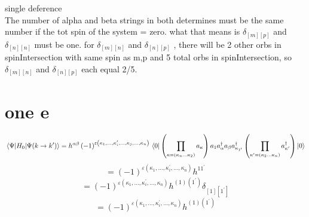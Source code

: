 \documentclass{article}
\begin{document}
single deference\\
The number of alpha and beta strings in both determines must be the same number if the tot spin of the system = zero.  what that means is $\delta _{[m][p]}$ and $\delta _{[n][n]}$ must be one. for $\delta _{[m][n]}$ and $\delta _{[n][p]}$ , there will be 2 other orbs in spinIntersection with same spin as m,p and 5 total orbs in spinIntersection, so $\delta _{[m][n]}$ and $\delta _{[n][p]}$ each equal 2/5.
\section{one e}
\begin{equation}
    \mel{\Psi }{H_{0}}{\Psi (k\rightarrow k^{\prime})}=h^{\alpha\beta}\left(-1\right)^{\varepsilon\left(\kappa_{1},\dots,\kappa_{i}^{\prime},\dots,\kappa _{j},...,\kappa_{n}\right)}\\
    \bra{0}\left(\prod_{\kappa=\left(\kappa_{n}\dots\kappa_{2}\right)}a_{\kappa}\right)
        a_{1}a^{\dag}_{\alpha  }a_{\beta }a^{\dag}_{\kappa _{1^{\prime}}}
    \left(\prod_{\kappa^{\prime}=\left(\kappa_{2}\dots\kappa_{n}\right)}a^{\dag}_{\kappa^{\prime}}\right)\ket{0}
\end{equation}
\begin{equation}
    =\left(-1\right)^{\varepsilon\left(\kappa_{1},\dots,\kappa_{i}^{\prime},\dots,\kappa_{n}\right)}h^{11^{\prime}}
\end{equation}
\begin{equation}
    =\left(-1\right)^{\varepsilon\left(\kappa_{1},\dots,\kappa_{i}^{\prime},\dots,\kappa_{n}\right)}h^{(1)(1^{\prime})}\delta _{[1][1^{\prime}]}
\end{equation}
\begin{equation}
    =\left(-1\right)^{\varepsilon\left(\kappa_{1},\dots,\kappa_{i}^{\prime},\dots,\kappa_{n}\right)}h^{(1)(1^{\prime})}
\end{equation}
\end{document}
